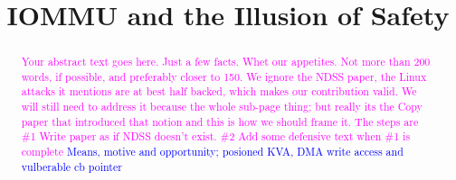\usepackage{filecontents}

\providecommand{\shinfo}{\texttt{skb\_shared\_info }}
\providecommand{\skb}{\texttt{sk\_buff }}
\providecommand{\page}{\texttt{struct page }}
\providecommand{\uarg}{\texttt{ubuf\_info }}
\providecommand{\kva}{KVA }
\providecommand{\iova}{IOVA }
\providecommand{\mabaf}{malicious buffer }
\providecommand{\spb}{SPB\-2 }
\providecommand{\oportunity}{\textit{Opportunity} }
\providecommand{\means}{\textit{Means} }


\date{}

\title{\Large \bf IOMMU and the Illusion of Safety}

\begin{comment}
\author{
{\rm Markuze Alex}\\
Technion, VMware Research
\and
{\rm Gil Kupfer}\\
Technion
\and
{\rm Nadav Amit}\\
VMware Research
\and{\rm Dan Tsafrir}\\
Technion, VMware Research
} %
\end{comment}

\maketitle

\begin{abstract}
\textcolor{magenta}{Your abstract text goes here. Just a few facts. Whet our appetites.
Not more than 200 words, if possible, and preferably closer to 150.\newline
We ignore the NDSS paper, the Linux attacks it mentions are at best half backed, which makes our contribution valid. We will still need to address it because the whole sub-page thing; but really its the Copy paper that introduced that notion and this is how we should frame it. The steps are \#1 Write paper as if NDSS doesn't exist. \#2 Add some defensive text when \#1 is complete}
\newline
\textcolor{blue}{Means, motive and opportunity; posioned KVA, DMA write access and vulberable cb pointer}
\end{abstract}


